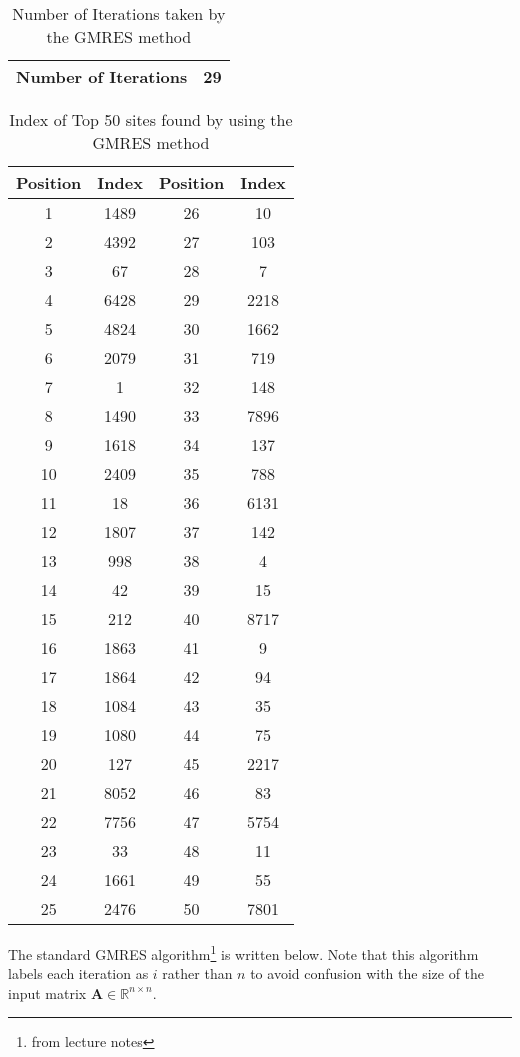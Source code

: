 \documentclass{article}
\newcommand{\RR}{\mathbb{R}}
\begin{document}
\begin{enumerate}
	\begin{table}[h!]
		\centering
		\begin{tabular}{|c|c|}
			\hline
			Number of Iterations & 29 \\
			\hline
		\end{tabular}
	\caption{Number of Iterations taken by the GMRES method}
	\end{table}
	\begin{table}[h!]
			\centering
	\begin{tabular}{|c|c|c|c|} 
		\hline
		Position & Index & Position & Index \\
		\hline
		1 & 1489 & 26 & 10\\ 2 & 4392 & 27 & 103\\ 3 & 67 & 28 & 7\\ 4 & 6428 & 29 & 2218\\ 5 & 4824 & 30 & 1662\\ 6 & 2079 & 31 & 719\\ 7 & 1 & 32 & 148\\ 8 & 1490 & 33 & 7896\\ 9 & 1618 & 34 & 137\\ 10 & 2409 & 35 & 788\\ 11 & 18 & 36 & 6131\\ 12 & 1807 & 37 & 142\\ 13 & 998 & 38 & 4\\ 14 & 42 & 39 & 15\\ 15 & 212 & 40 & 8717\\ 16 & 1863 & 41 & 9\\ 17 & 1864 & 42 & 94\\ 18 & 1084 & 43 & 35\\ 19 & 1080 & 44 & 75\\ 20 & 127 & 45 & 2217\\ 21 & 8052 & 46 & 83\\ 22 & 7756 & 47 & 5754\\ 23 & 33 & 48 & 11\\ 24 & 1661 & 49 & 55\\ 25 & 2476 & 50 & 7801 \\
		\hline 
	\end{tabular}
	\caption{Index of Top 50 sites found by using the GMRES method}
	\end{table} 
	
	\newpage
	The standard GMRES algorithm\footnote{from lecture notes} is written below. Note that this algorithm labels each iteration as $i$ rather than $n$ to avoid confusion with the size of the input matrix $\boldsymbol{A} \in \RR^{n \times n}$.
	

\end{enumerate}
\end{document}
